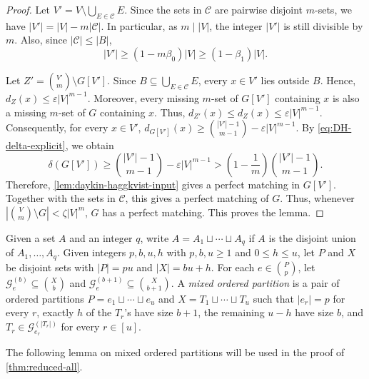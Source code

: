 \documentclass[10pt,a4paper]{article}
\numberwithin{equation}{section}
\theoremstyle{definition}
\newcommand{\G}{\mathcal G}
\begin{document}
\begin{proof}
        Let $V'=V\setminus\bigcup_{E\in\mathcal C}E$.
        Since the sets in $\mathcal C$ are pairwise disjoint $m$-sets, we have $|V'|=|V|-m|\mathcal C|$.
        In particular, as $m\mid |V|$, the integer $|V'|$ is still divisible by $m$.
        Also, since $|\mathcal C|\le |B|$,
        \[
                |V'|\ge(1-m\beta_0)|V|\ge(1-\beta_1)|V|.
        \]

        Let $Z'=\binom{V'}m\setminus G[V']$.
        Since $B\subseteq\bigcup_{E\in\mathcal C}E$, every $x\in V'$ lies outside $B$.
        Hence, $d_Z(x)\le \varepsilon |V|^{m-1}$.
        Moreover, every missing $m$-set of $G[V']$ containing $x$ is also a missing $m$-set of $G$ containing $x$.
        Thus, $d_{Z'}(x)\le d_Z(x)\le \varepsilon |V|^{m-1}$.
        Consequently, for every $x\in V'$, $d_{G[V']}(x) \ge \binom{|V'|-1}{m-1}-\varepsilon |V|^{m-1}$.
        By \eqref{eq:DH-delta-explicit}, we obtain
        \[
                \delta(G[V'])
                \ge \binom{|V'|-1}{m-1}-\varepsilon |V|^{m-1}
                > \left(1-\frac1m\right)\binom{|V'|-1}{m-1}.
        \]
        Therefore, \cref{lem:daykin-haggkvist-input} gives a perfect matching in $G[V']$.
        Together with the sets in $\mathcal C$, this gives a perfect matching of $G$.
        Thus, whenever $\left|\binom Vm\setminus G\right|<\zeta |V|^m$, $G$ has a perfect matching.
        This proves the lemma.
\end{proof}

Given a set $A$ and an integer $q$, write $A=A_1\sqcup\cdots\sqcup A_q$ if $A$ is the disjoint union of $A_1,\ldots,A_q$.
Given integers $p,b,u,h$ with $p,b,u\ge1$ and $0\le h\le u$, let
$P$ and $X$ be disjoint sets with $|P|=pu$ and $|X|=bu+h$.
For each $e\in\binom Pp$, let $\G_e^{(b)}\subseteq\binom Xb$ and $\G_e^{(b+1)}\subseteq\binom X{b+1}$.
A \emph{mixed ordered partition} is a pair of ordered partitions $P=e_1\sqcup\cdots\sqcup e_u$ and $X=T_1\sqcup\cdots\sqcup T_u$ such that $|e_r|=p$ for every $r$, exactly $h$ of the $T_r$'s have size $b+1$, the remaining $u-h$ have size $b$, and $T_r\in\G_{e_r}^{(|T_r|)}$ for every $r\in[u]$.

The following lemma on mixed ordered partitions will be used in the proof of \cref{thm:reduced-all}.
\end{document}
